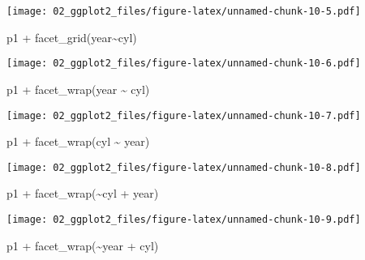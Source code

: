 \documentclass[
]{book}
\newenvironment{Shaded}{\begin{snugshade}}{\end{snugshade}}
\newcommand{\FunctionTok}[1]{\textcolor[rgb]{0.00,0.00,0.00}{#1}}
\newcommand{\NormalTok}[1]{#1}
\newcommand{\SpecialCharTok}[1]{\textcolor[rgb]{0.00,0.00,0.00}{#1}}
\begin{document}
\texttt{[image: 02\_ggplot2\_files/figure-latex/unnamed-chunk-10-5.pdf]}

\begin{Shaded}
\begin{Highlighting}[]
\NormalTok{p1 }\SpecialCharTok{+} \FunctionTok{facet\_grid}\NormalTok{(year}\SpecialCharTok{\textasciitilde{}}\NormalTok{cyl)}
\end{Highlighting}
\end{Shaded}

\texttt{[image: 02\_ggplot2\_files/figure-latex/unnamed-chunk-10-6.pdf]}

\begin{Shaded}
\begin{Highlighting}[]
\NormalTok{p1 }\SpecialCharTok{+} \FunctionTok{facet\_wrap}\NormalTok{(year }\SpecialCharTok{\textasciitilde{}}\NormalTok{ cyl)}
\end{Highlighting}
\end{Shaded}

\texttt{[image: 02\_ggplot2\_files/figure-latex/unnamed-chunk-10-7.pdf]}

\begin{Shaded}
\begin{Highlighting}[]
\NormalTok{p1 }\SpecialCharTok{+} \FunctionTok{facet\_wrap}\NormalTok{(cyl }\SpecialCharTok{\textasciitilde{}}\NormalTok{ year)}
\end{Highlighting}
\end{Shaded}

\texttt{[image: 02\_ggplot2\_files/figure-latex/unnamed-chunk-10-8.pdf]}

\begin{Shaded}
\begin{Highlighting}[]
\NormalTok{p1 }\SpecialCharTok{+} \FunctionTok{facet\_wrap}\NormalTok{(}\SpecialCharTok{\textasciitilde{}}\NormalTok{cyl }\SpecialCharTok{+}\NormalTok{ year)}
\end{Highlighting}
\end{Shaded}

\texttt{[image: 02\_ggplot2\_files/figure-latex/unnamed-chunk-10-9.pdf]}

\begin{Shaded}
\begin{Highlighting}[]
\NormalTok{p1 }\SpecialCharTok{+} \FunctionTok{facet\_wrap}\NormalTok{(}\SpecialCharTok{\textasciitilde{}}\NormalTok{year }\SpecialCharTok{+}\NormalTok{ cyl)}
\end{Highlighting}
\end{Shaded}
\end{document}

